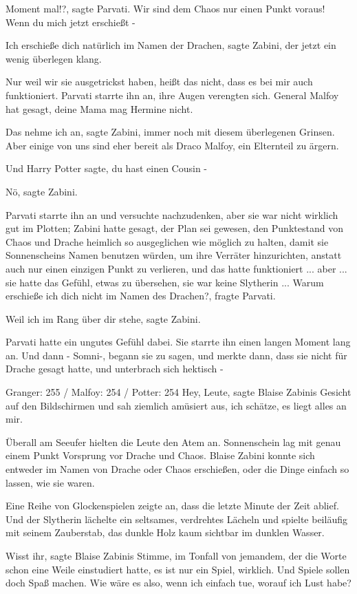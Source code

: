 \glqq{}Moment mal!?\grqq{}, sagte Parvati. \glqq{}Wir sind dem Chaos nur einen
Punkt voraus! Wenn du mich jetzt erschießt -\grqq{}

\glqq{}Ich erschieße dich natürlich im Namen der Drachen\grqq{}, sagte Zabini,
der jetzt ein wenig überlegen klang.

\glqq{}Nur weil wir sie ausgetrickst haben, heißt das nicht, dass es bei mir auch
funktioniert.\grqq{} Parvati starrte ihn an, ihre Augen verengten sich. \glqq{}
General Malfoy hat gesagt, deine Mama mag Hermine nicht.\grqq{}

\glqq{}Das nehme ich an\grqq{}, sagte Zabini, immer noch mit diesem überlegenen
Grinsen. \glqq{}Aber einige von uns sind eher bereit als Draco Malfoy, ein
Elternteil zu ärgern.\grqq{}

\glqq{}Und Harry Potter sagte, du hast einen Cousin -\grqq{}

\glqq{}Nö\grqq{}, sagte Zabini.

Parvati starrte ihn an und versuchte nachzudenken, aber sie war nicht wirklich
gut im Plotten; Zabini hatte gesagt, der Plan sei gewesen, den Punktestand von
Chaos und Drache heimlich so ausgeglichen wie möglich zu halten, damit sie
Sonnenscheins Namen benutzen würden, um ihre Verräter hinzurichten, anstatt auch
nur einen einzigen Punkt zu verlieren, und das hatte funktioniert ... aber ... sie
hatte das Gefühl, etwas zu übersehen, sie war keine Slytherin ... \glqq{}Warum
erschieße ich dich nicht im Namen des Drachen?\grqq{}, fragte Parvati.

\glqq{}Weil ich im Rang über dir stehe\grqq{}, sagte Zabini.

Parvati hatte ein ungutes Gefühl dabei. Sie starrte ihn einen langen Moment lang
an. Und dann - \glqq{}Somni-\grqq{}, begann sie zu sagen, und merkte dann, dass
sie nicht für Drache gesagt hatte, und unterbrach sich hektisch -

Granger: 255 / Malfoy: 254 / Potter: 254 \glqq{}Hey, Leute\grqq{}, sagte Blaise
Zabinis Gesicht auf den Bildschirmen und sah ziemlich amüsiert aus, \glqq{}ich
schätze, es liegt alles an mir.\grqq{}

Überall am Seeufer hielten die Leute den Atem an. Sonnenschein lag mit genau
einem Punkt Vorsprung vor Drache und Chaos. Blaise Zabini konnte sich entweder
im Namen von Drache oder Chaos erschießen, oder die Dinge einfach so lassen, wie
sie waren.

Eine Reihe von Glockenspielen zeigte an, dass die letzte Minute der Zeit ablief.
Und der Slytherin lächelte ein seltsames, verdrehtes Lächeln und spielte
beiläufig mit seinem Zauberstab, das dunkle Holz kaum sichtbar im dunklen
Wasser.

\glqq{}Wisst ihr\grqq{}, sagte Blaise Zabinis Stimme, im Tonfall von jemandem,
der die Worte schon eine Weile einstudiert hatte, \glqq{}es ist nur ein Spiel,
wirklich. Und Spiele sollen doch Spaß machen. Wie wäre es also, wenn ich einfach
tue, worauf ich Lust habe?\grqq{}


